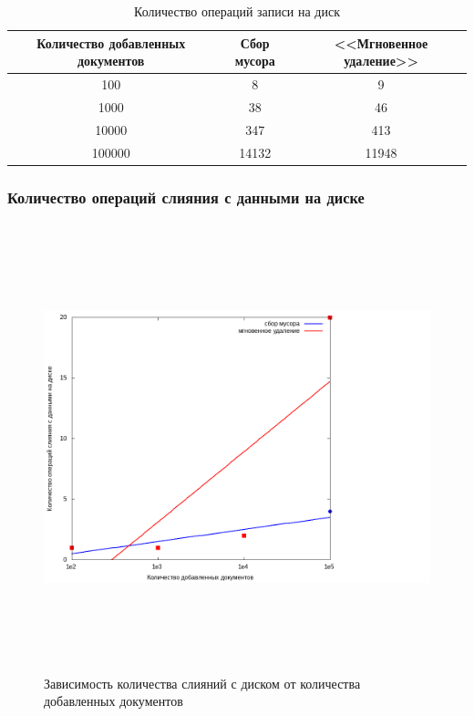 \begin{table}[H]
      \caption{Количество операций записи на диск}
      \centering
      \small
      \singlespacing
      \begin{tabular}{|c|c|c|}
            \hline
            Количество добавленных документов   & Сбор мусора                 & <<Мгновенное удаление>>     \\ \hline \hline
            100                                 & 8                           & 9                           \\ \hline
            1000                                & 38                          & 46                          \\ \hline
            10000                               & 347                         & 413                         \\ \hline
            100000                              & 14132                       & 11948                       \\ \hline
\end{tabular}
\end{table}

\subsubsection{Количество операций слияния с данными на диске}

\begin{figure}[H]
\centering
\includegraphics[width=22cm, height=13cm]{fig/merges.png}
\caption{Зависимость количества слияний с диском от количества добавленных документов}
\end{figure}

